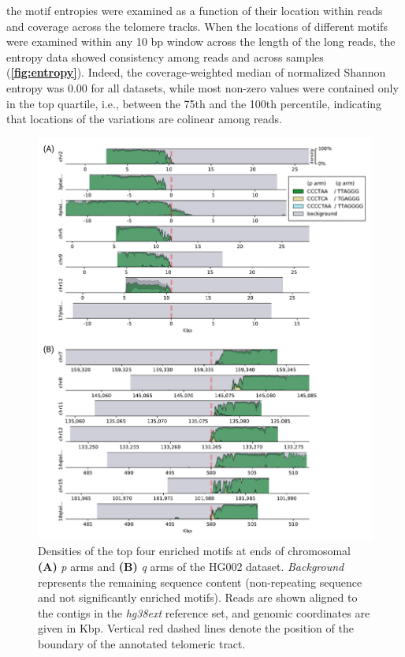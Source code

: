 \documentclass{article}
\begin{document}
            the motif entropies were examined as a function of their location within reads and coverage across the telomere tracks.
        When the locations of different motifs were examined within any 10 bp window across the length of the long reads,
            the entropy data showed consistency among reads and across samples (\textbf{\autoref{fig:entropy}}).
        Indeed, the coverage-weighted median of normalized Shannon entropy was 0.00 for all datasets,
            while most non-zero values were contained only in the top quartile,
            i.e., between the 75th and the 100th percentile,
            indicating that locations of the variations are colinear among reads.
        \begin{figure}[h!] \centering
        \includegraphics[height=.88\textheight,width=\textwidth,keepaspectratio]{../figures/Figure_2.pdf}
        \caption{
             \small Densities of the top four enriched motifs at ends of chromosomal \textbf{(A)} \textit{p} arms
             and \textbf{(B)} \textit{q} arms of the HG002 dataset.
             \textit{Background} represents the remaining sequence content (non-repeating sequence and not significantly enriched motifs).
             Reads are shown aligned to the contigs in the \textit{hg38ext} reference set, and genomic coordinates are given in Kbp.
             Vertical red dashed lines denote the position of the boundary of the annotated telomeric tract.
        }
        \label{fig:hg002_densityplot}
        \end{figure}
\end{document}
